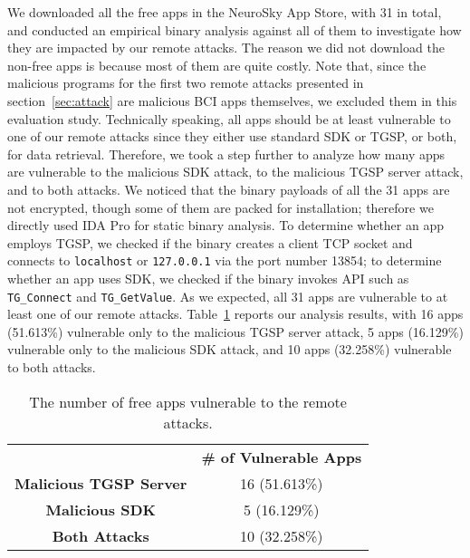 \indent We downloaded all the free apps in the NeuroSky App Store, with 31 in total, and conducted an empirical binary analysis against all of them to investigate how they are impacted by our remote attacks. The reason we did not download the non-free apps is because most of them are quite  costly. Note that, since the malicious programs for the first two remote attacks presented in section~\ref{sec:attack} are malicious BCI apps themselves, we excluded them in this evaluation study. Technically speaking, all apps should be at least vulnerable to one of our remote attacks since they either use standard SDK or TGSP, or both, for data retrieval. Therefore, we took a step further to analyze how many apps are vulnerable to the malicious SDK attack, to the malicious TGSP server attack, and to both attacks. We noticed that the binary payloads of all the 31 apps are not encrypted, though some of them are packed for installation; therefore we directly used IDA Pro for static binary analysis. To determine whether an app employs TGSP, we checked if the binary creates a client TCP socket and connects to \texttt{localhost} or \texttt{127.0.0.1} via the port number 13854; to determine whether an app uses SDK, we checked if the binary invokes API such as \texttt{TG\_Connect} and \texttt{TG\_GetValue}. As we expected, all 31 apps are vulnerable to at least one of our remote attacks. Table~\ref{tbl:influence} reports our analysis results, with 16 apps (51.613\%) vulnerable only to the malicious TGSP server attack, 5 apps (16.129\%) vulnerable only to the malicious SDK attack, and 10 apps (32.258\%) vulnerable to both attacks.

\begin{table}[!htb]
\centering
\caption{The number of free apps vulnerable to the remote attacks.}
\label{tbl:influence}
\begin{tabular}{cc}
\Xhline{2\arrayrulewidth}
\textbf{}                       & \textbf{\# of Vulnerable Apps} \\ \Xhline{2\arrayrulewidth}
\textbf{Malicious TGSP Server} & 16 (51.613\%)                  \\ \hline
\textbf{Malicious SDK} & 5 (16.129\%)                   \\ \hline
\textbf{Both Attacks}           & 10 (32.258\%)                  \\ \hline
\end{tabular}
\end{table}


